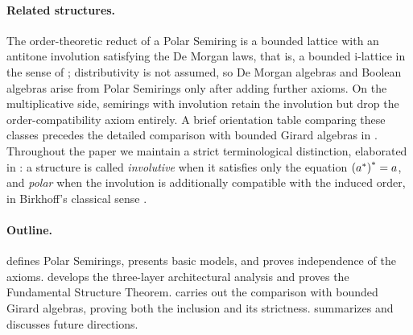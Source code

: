 \paragraph{Related structures.}
The order-theoretic reduct of a Polar Semiring is a bounded lattice with an
antitone involution satisfying the De Morgan laws, that is, a bounded
i-lattice in the sense of \citet{Kalman1958}; distributivity is not assumed,
so De Morgan algebras \citep{Rasiowa1974} and Boolean algebras arise from
Polar Semirings only after adding further axioms. On the multiplicative side,
semirings with involution \citep{Golan1999} retain the involution but drop
the order-compatibility axiom entirely. A brief orientation table comparing
these classes precedes the detailed comparison with bounded Girard algebras
in . Throughout the paper we maintain a strict
terminological distinction, elaborated in : a structure is
called \emph{involutive} when it satisfies only the equation
${({a}^{*})}^{*}=a$, and \emph{polar} when the involution is additionally
compatible with the induced order, in Birkhoff's classical sense
\citep{Birkhoff1940}.

\paragraph{Outline.}
 defines Polar Semirings, presents basic models, and proves
independence of the axioms.  develops the three-layer
architectural analysis and proves the Fundamental Structure Theorem.
 carries out the comparison with bounded Girard
algebras, proving both the inclusion and its strictness.
 summarizes and discusses future directions.
